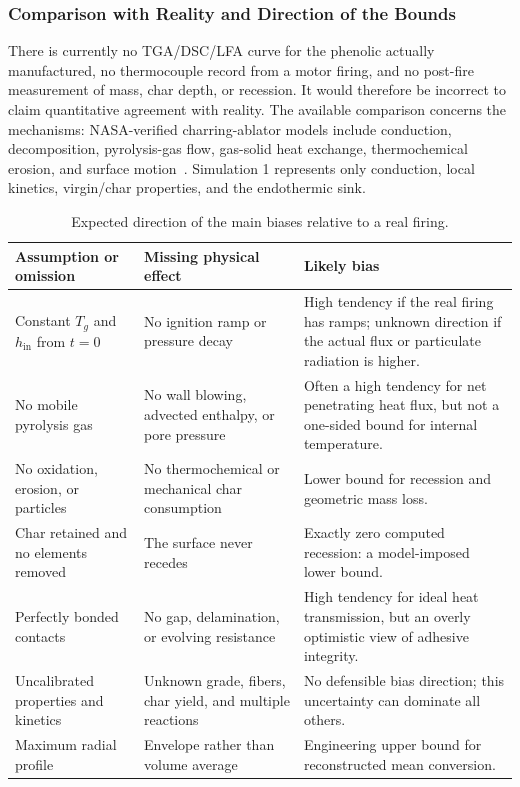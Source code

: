 \documentclass[oneside,openany]{amsdtx}
\begin{document}
\subsubsection{Comparison with Reality and Direction of the Bounds}

There is currently no TGA/DSC/LFA curve for the phenolic actually manufactured,
no thermocouple record from a motor firing, and no post-fire measurement of
mass, char depth, or recession. It would therefore be incorrect to claim
quantitative agreement with reality. The available comparison concerns the
mechanisms: NASA-verified charring-ablator models include conduction,
decomposition, pyrolysis-gas flow, gas-solid heat exchange, thermochemical
erosion, and surface motion~\cite{ewing2013,amar2010,amar2016}. Simulation 1
represents only conduction, local kinetics, virgin/char properties, and the
endothermic sink.

\begin{table}[H]
\centering
\footnotesize
\renewcommand{\arraystretch}{1.18}
\begin{tabular}{L{0.25\textwidth}L{0.34\textwidth}L{0.31\textwidth}}
\toprule
\textbf{Assumption or omission} & \textbf{Missing physical effect} &
\textbf{Likely bias} \\
\midrule
Constant \(T_g\) and \(h_\mathrm{in}\) from \(t=0\) &
No ignition ramp or pressure decay &
High tendency if the real firing has ramps; unknown direction if the actual
flux or particulate radiation is higher. \\
No mobile pyrolysis gas &
No wall blowing, advected enthalpy, or pore pressure &
Often a high tendency for net penetrating heat flux, but not a one-sided bound
for internal temperature. \\
No oxidation, erosion, or particles &
No thermochemical or mechanical char consumption &
Lower bound for recession and geometric mass loss. \\
Char retained and no elements removed &
The surface never recedes &
Exactly zero computed recession: a model-imposed lower bound. \\
Perfectly bonded contacts &
No gap, delamination, or evolving resistance &
High tendency for ideal heat transmission, but an overly optimistic view of
adhesive integrity. \\
Uncalibrated properties and kinetics &
Unknown grade, fibers, char yield, and multiple reactions &
No defensible bias direction; this uncertainty can dominate all others. \\
Maximum radial profile &
Envelope rather than volume average &
Engineering upper bound for reconstructed mean conversion. \\
\bottomrule
\end{tabular}~\\[1em]
\caption{Expected direction of the main biases relative to a real firing.}
\label{tab:sim1-reality-bounds}
\end{table}
\end{document}

